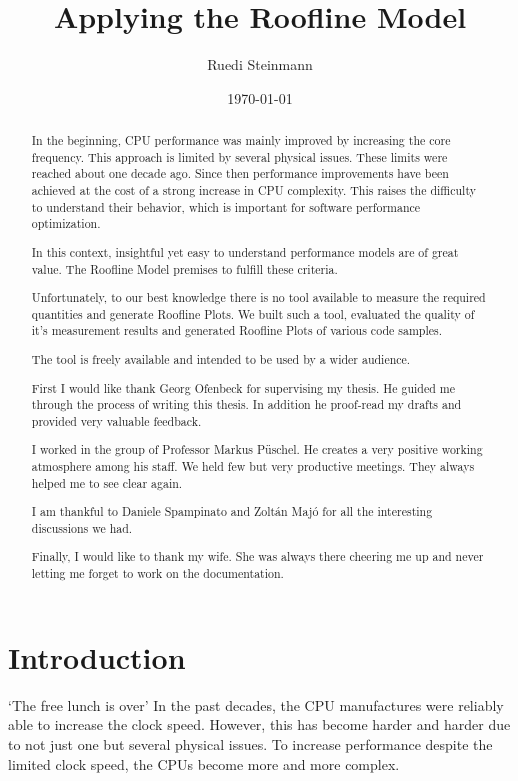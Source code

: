 \documentclass[a4paper,12pt]{report}
\title{Applying the Roofline Model}
\author{Ruedi Steinmann}
\date{\today}
\begin{document}
\maketitle

\begin{abstract}

In the beginning, CPU performance was mainly improved by increasing the core
frequency. This approach is limited by several physical issues. These limits
were reached about one decade ago. Since then performance improvements have been
achieved at the cost of a strong increase in CPU complexity. This raises the
difficulty to understand their behavior, which is important for software
performance optimization.

In this context, insightful yet easy to understand performance models are of
great value. The Roofline Model premises to fulfill these criteria.

Unfortunately, to our best knowledge there is no tool available to measure the
required quantities and generate Roofline Plots. We built such a tool, evaluated
the quality of it's measurement results and generated Roofline Plots of various
code samples.

The tool is freely available and intended to be used by a wider audience.
\end{abstract}

\tableofcontents

\renewcommand{\abstractname}{Acknowledgements}
\begin{abstract}
First I would like thank Georg Ofenbeck for supervising my thesis. He guided me
through the process of writing this thesis. In addition he proof-read my drafts
and provided very valuable feedback.

I worked in the group of Professor Markus P\"uschel. He creates a very
positive working atmosphere among his staff. We held few but very productive
meetings. They always helped me to see clear again.

I am thankful to Daniele Spampinato and Zolt\'an Maj\'o
for all the interesting discussions we had.

Finally, I would like to thank my wife. She was always there
cheering me up and never letting me forget to work on the documentation.

\end{abstract}

\newpage

\chapter{Introduction}
`The free lunch is over' \cite{FreeLunchIsOver} In the past decades, the CPU
manufactures were reliably able to increase the clock speed. However, this has
become harder and harder due to not just one but several physical issues. To
increase performance despite the limited clock speed, the CPUs become more
and more complex.
\end{document}
